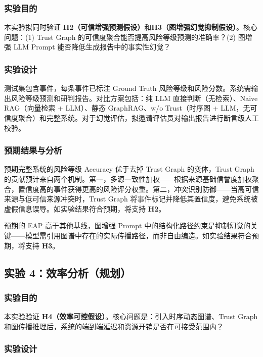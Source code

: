 \subsubsection{实验目的}

本实验拟同时验证 \textbf{H2（可信增强预测假设）}和\textbf{H3（图增强幻觉抑制假设）}。核心问题：(1) Trust Graph 的可信度聚合能否提高风险等级预测的准确率？(2) 图增强 LLM Prompt 能否降低生成报告中的事实性幻觉？

\subsubsection{实验设计}

测试集包含事件，每条事件已标注 Ground Truth 风险等级和风险分数。系统需输出风险等级预测和研判报告。对比方案包括：纯 LLM 直接判断（无检索）、Naive RAG（向量检索 + LLM）、静态 GraphRAG、\projectshort w/o Trust（时序图 + LLM，无可信度聚合）和\projectshort 完整系统。对于幻觉评估，拟邀请评估员对输出报告进行断言级人工校验。

\subsubsection{预期结果与分析}

预期\projectshort 完整系统的风险等级 Accuracy 优于去掉 Trust Graph 的变体，Trust Graph 的贡献预计来自两个机制。第一，多源一致性加权——根据来源基础信誉度加权聚合，置信度高的事件获得更高的风险评分权重。第二，冲突识别防御——当高可信来源与低可信来源冲突时，Trust Graph 将事件标记并降低其置信度，避免系统被虚假信息误导。如实验结果符合预期，将支持 \textbf{H2}。

预期\projectshort 的 EAP 高于其他基线，图增强 Prompt 中的结构化路径约束是抑制幻觉的关键——模型需引用图谱中存在的实际传播路径，而非自由编造。如实验结果符合预期，将支持 \textbf{H3}。

\subsection{实验 4：效率分析（规划）}
\label{sec:exp-efficiency}

\subsubsection{实验目的}

本实验验证 \textbf{H4（效率可控假设）}。核心问题是：引入时序动态图谱、Trust Graph 和图传播推理后，系统的端到端延迟和资源开销是否在可接受范围内？

\subsubsection{实验设计}

